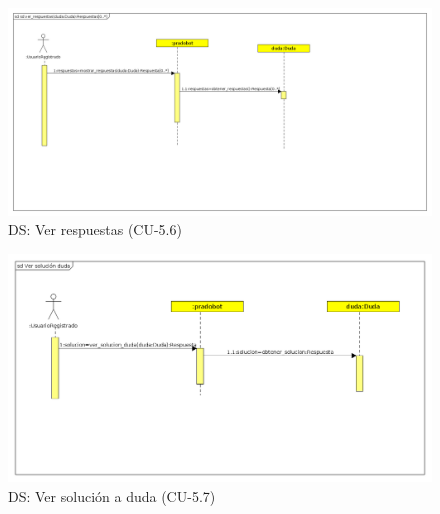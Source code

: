 \begin{figure}[H] %
\centering
\includegraphics[scale=0.27]{imagenes/diagramas/secuencia/analisis/ver_respuestas_duda.png}  %

\caption{DS: Ver respuestas (CU-5.6) }\label{figura87}

\end{figure}


\begin{figure}[H] %
\centering
\includegraphics[scale=0.35]{imagenes/diagramas/secuencia/analisis/ver_solucion_duda.png}  %

\caption{DS: Ver solución a duda (CU-5.7) }\label{figura88}

\end{figure}

